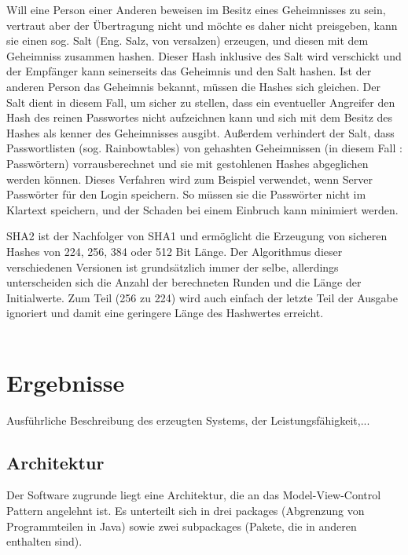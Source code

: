 \documentclass[12pt,a4paper,bibliography=totocnumbered,listof=totocnumbered]{scrartcl}
\begin{document}
Will eine Person einer Anderen beweisen im Besitz eines Geheimnisses zu sein, vertraut aber der Übertragung nicht und möchte es daher nicht preisgeben, kann sie einen sog. Salt (Eng. Salz, von versalzen) erzeugen, und diesen mit dem Geheimniss zusammen hashen. Dieser Hash inklusive des Salt wird verschickt und der Empfänger kann seinerseits das Geheimnis und den Salt hashen. Ist der anderen Person das Geheimnis bekannt, müssen die Hashes sich gleichen. Der Salt dient in diesem Fall, um sicher zu stellen, dass ein eventueller Angreifer den Hash des reinen Passwortes nicht aufzeichnen kann und sich mit dem Besitz des Hashes als kenner des Geheimnisses ausgibt. Außerdem verhindert der Salt, dass Passwortlisten (sog. Rainbowtables) von gehashten Geheimnissen (in diesem Fall : Passwörtern) vorrausberechnet und sie mit gestohlenen Hashes abgeglichen werden können. Dieses Verfahren wird zum Beispiel verwendet, wenn Server Passwörter für den Login speichern. So müssen sie die Passwörter nicht im Klartext speichern, und der Schaden bei einem Einbruch kann minimiert werden. 

SHA2 ist der Nachfolger von SHA1 und ermöglicht die Erzeugung von sicheren Hashes von 224, 256, 384 oder 512 Bit Länge. Der Algorithmus dieser verschiedenen Versionen ist grundsätzlich immer der selbe, allerdings unterscheiden sich die Anzahl der berechneten Runden und die Länge der Initialwerte. Zum Teil (256 zu 224) wird auch einfach der letzte Teil der Ausgabe ignoriert und damit eine geringere Länge des Hashwertes erreicht.
\\\cite{8}\cite{9}\cite{10}\\
\pagebreak



\section{Ergebnisse}
Ausführliche Beschreibung des erzeugten Systems, der Leistungsfähigkeit,...
\subsection{Architektur}
Der Software zugrunde liegt eine Architektur, die an das Model-View-Control Pattern angelehnt ist. Es unterteilt sich in drei packages (Abgrenzung von Programmteilen in Java) sowie zwei subpackages (Pakete, die in anderen enthalten sind).
\end{document}
